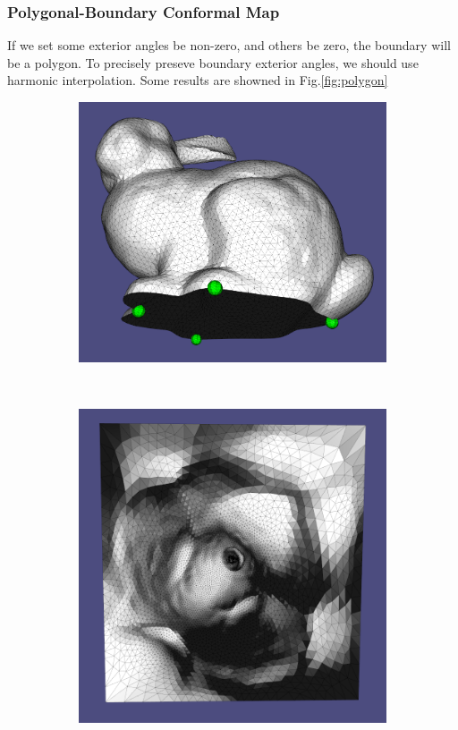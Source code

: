 \subsubsection{Polygonal-Boundary Conformal Map}
If we set some exterior angles be non-zero, and others be zero, the boundary will be a polygon. To precisely preseve boundary exterior angles, we should use harmonic interpolation. Some results are showned in Fig.\ref{fig:polygon}

\begin{figure}
\centering
\begin{subfigure}{0.25\textwidth}
\includegraphics[height = \textwidth]{images/bunny_polygon}
\caption{}
\end{subfigure}\ \ \ \ \ \ \ \ \ \ \ \ \
\begin{subfigure}{0.25\textwidth}
\includegraphics[height = \textwidth]{images/bunny_polygon_emb}

\end{subfigure}
\end{figure}
